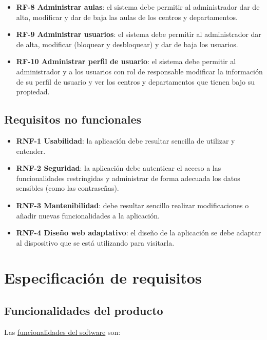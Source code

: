\begin{itemize}
	\item \textbf{RF-8 Administrar aulas}: el sistema debe permitir al administrador dar de alta, modificar y dar de baja las aulas de los centros y departamentos.
	    
	\item \textbf{RF-9 Administrar usuarios}: el sistema debe permitir al administrador dar de alta, modificar (bloquear y desbloquear) y dar de baja los usuarios.
	    
	\item \textbf{RF-10 Administrar perfil de usuario}: el sistema debe permitir al administrador y a los usuarios con rol de responsable modificar la información de su perfil de usuario y ver los centros y departamentos que tienen bajo su propiedad.

\end{itemize}

\subsection{Requisitos no funcionales}
\begin{itemize}
    \item \textbf{RNF-1 Usabilidad}: la aplicación debe resultar sencilla de utilizar y entender.
    
    \item \textbf{RNF-2 Seguridad}: la aplicación debe autenticar el acceso a las funcionalidades restringidas y administrar de forma adecuada los datos sensibles (como las contraseñas).
    
    \item \textbf{RNF-3 Mantenibilidad}: debe resultar sencillo realizar modificaciones o añadir nuevas funcionalidades a la aplicación.
    
    \item \textbf{RNF-4 Diseño web adaptativo}: el diseño de la aplicación se debe adaptar al dispositivo que se está utilizando para visitarla.
\end{itemize}

\section{Especificación de requisitos} 

\subsection{Funcionalidades del producto}
Las \underline{funcionalidades del software} son:

